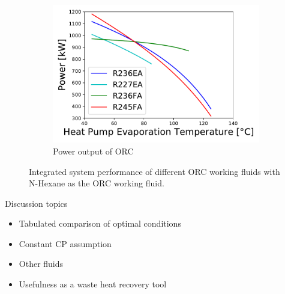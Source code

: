 \documentclass[a4paper,12pt]{article}
\begin{document}
\begin{figure}[H]
    \begin{subfigure}[H]{.32\textwidth}
      \centering
      \includegraphics[scale = 0.35]{Images/P_ORC_FLUIDS_ORC.pdf}
      \caption{Power output of ORC}
      \label{fig:P_ORC_ORC}
    \end{subfigure}
\caption{Integrated system performance of different ORC working fluids with N-Hexane as the ORC working fluid.}
\label{fig:Fluids_ORC}
\end{figure}

Discussion topics
\begin{itemize}
    \item Tabulated comparison of optimal conditions
    \item Constant CP assumption
    \item Other fluids
    \item Usefulness as a waste heat recovery tool
\end{itemize}



\newpage
\end{document}
